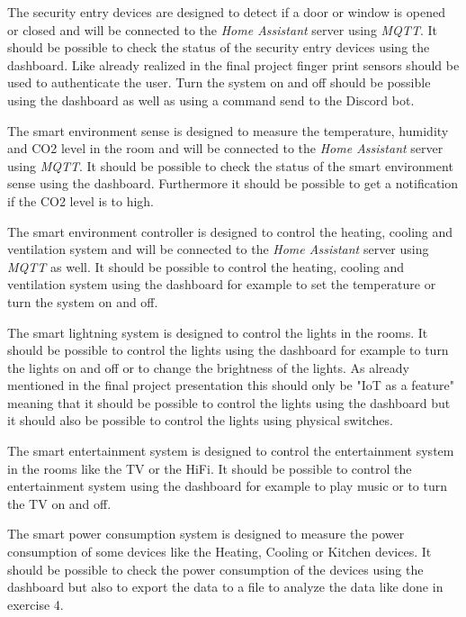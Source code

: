 The security entry devices are designed to detect if a door or window is opened or closed and will be connected to the 
\textit{Home Assistant} server using \textit{MQTT}. It should be possible to check the status of the security entry 
devices using the dashboard. Like already realized in the final project finger print sensors should be used to 
authenticate the user. Turn the system on and off should be possible using the dashboard as well as using a 
command send to the Discord bot.

The smart environment sense is designed to measure the temperature, humidity and CO2 level in the room and will be 
connected to the \textit{Home Assistant} server using \textit{MQTT}. It should be possible to check the status of the 
smart environment sense using the dashboard. Furthermore it should be possible to get a notification if the CO2 level 
is to high.

The smart environment controller is designed to control the heating, cooling and ventilation system and will be 
connected to the \textit{Home Assistant} server using \textit{MQTT} as well.
It should be possible to control the heating, cooling and ventilation system using the dashboard for 
example to set the temperature or turn the system on and off.

The smart lightning system is designed to control the lights in the rooms.
It should be possible to control the lights using the dashboard for example to turn the lights on and off or to change 
the brightness of the lights. As already mentioned in the final project presentation this should only be "IoT as a 
feature" meaning that it should be possible to control the lights using the dashboard but it should also be possible to 
control the lights using physical switches.

The smart entertainment system is designed to control the entertainment system in the rooms like the TV or the HiFi.
It should be possible to control the entertainment system using the dashboard for example to play music or to turn the 
TV on and off.

The smart power consumption system is designed to measure the power consumption of some devices like the Heating, 
Cooling or Kitchen devices. It should be possible to check the power consumption of the devices using the dashboard 
but also to export the data to a file to analyze the data like done in exercise 4.